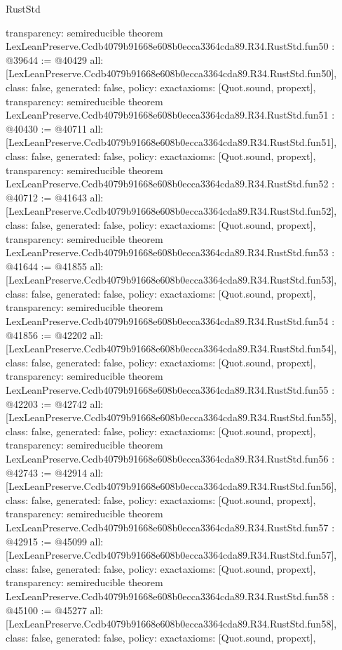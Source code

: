 \begin{lexlean}{RustStd}
\begin{coremodule}
{  transparency: semireducible
}
theorem LexLeanPreserve.Ccdb4079b91668e608b0ecca3364cda89.R34.RustStd.fun50 : @39644 := @40429 {
  all: [LexLeanPreserve.Ccdb4079b91668e608b0ecca3364cda89.R34.RustStd.fun50],
  class: false,
  generated: false,
  policy: exact{axioms: [Quot.sound, propext]},
  transparency: semireducible
}
theorem LexLeanPreserve.Ccdb4079b91668e608b0ecca3364cda89.R34.RustStd.fun51 : @40430 := @40711 {
  all: [LexLeanPreserve.Ccdb4079b91668e608b0ecca3364cda89.R34.RustStd.fun51],
  class: false,
  generated: false,
  policy: exact{axioms: [Quot.sound, propext]},
  transparency: semireducible
}
theorem LexLeanPreserve.Ccdb4079b91668e608b0ecca3364cda89.R34.RustStd.fun52 : @40712 := @41643 {
  all: [LexLeanPreserve.Ccdb4079b91668e608b0ecca3364cda89.R34.RustStd.fun52],
  class: false,
  generated: false,
  policy: exact{axioms: [Quot.sound, propext]},
  transparency: semireducible
}
theorem LexLeanPreserve.Ccdb4079b91668e608b0ecca3364cda89.R34.RustStd.fun53 : @41644 := @41855 {
  all: [LexLeanPreserve.Ccdb4079b91668e608b0ecca3364cda89.R34.RustStd.fun53],
  class: false,
  generated: false,
  policy: exact{axioms: [Quot.sound, propext]},
  transparency: semireducible
}
theorem LexLeanPreserve.Ccdb4079b91668e608b0ecca3364cda89.R34.RustStd.fun54 : @41856 := @42202 {
  all: [LexLeanPreserve.Ccdb4079b91668e608b0ecca3364cda89.R34.RustStd.fun54],
  class: false,
  generated: false,
  policy: exact{axioms: [Quot.sound, propext]},
  transparency: semireducible
}
theorem LexLeanPreserve.Ccdb4079b91668e608b0ecca3364cda89.R34.RustStd.fun55 : @42203 := @42742 {
  all: [LexLeanPreserve.Ccdb4079b91668e608b0ecca3364cda89.R34.RustStd.fun55],
  class: false,
  generated: false,
  policy: exact{axioms: [Quot.sound, propext]},
  transparency: semireducible
}
theorem LexLeanPreserve.Ccdb4079b91668e608b0ecca3364cda89.R34.RustStd.fun56 : @42743 := @42914 {
  all: [LexLeanPreserve.Ccdb4079b91668e608b0ecca3364cda89.R34.RustStd.fun56],
  class: false,
  generated: false,
  policy: exact{axioms: [Quot.sound, propext]},
  transparency: semireducible
}
theorem LexLeanPreserve.Ccdb4079b91668e608b0ecca3364cda89.R34.RustStd.fun57 : @42915 := @45099 {
  all: [LexLeanPreserve.Ccdb4079b91668e608b0ecca3364cda89.R34.RustStd.fun57],
  class: false,
  generated: false,
  policy: exact{axioms: [Quot.sound, propext]},
  transparency: semireducible
}
theorem LexLeanPreserve.Ccdb4079b91668e608b0ecca3364cda89.R34.RustStd.fun58 : @45100 := @45277 {
  all: [LexLeanPreserve.Ccdb4079b91668e608b0ecca3364cda89.R34.RustStd.fun58],
  class: false,
  generated: false,
  policy: exact{axioms: [Quot.sound, propext]},
}
\end{coremodule}
\end{lexlean}
